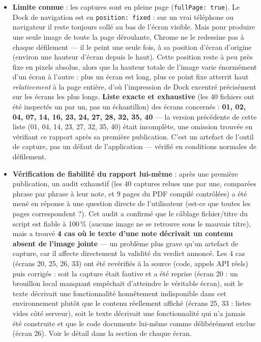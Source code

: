 \documentclass[11pt]{article}
\begin{document}
\begin{itemize}
  \item \textbf{Limite connue} : les captures sont en \og pleine page\fg{} (\texttt{fullPage: true}). Le Dock de navigation est en \texttt{position: fixed} : sur un vrai téléphone ou navigateur il reste toujours collé au bas de l'écran visible. Mais pour produire une seule image de toute la page déroulante, Chrome ne le redessine pas à chaque défilement — il le peint une seule fois, à sa position d'écran d'origine (environ une hauteur d'écran depuis le haut). Cette position reste à peu près fixe en pixels absolus, alors que la hauteur totale de l'image varie énormément d'un écran à l'autre : plus un écran est long, plus ce point fixe atterrit haut \emph{relativement} à la page entière, d'où l'impression de Dock \og excentré\fg{} précisément sur les écrans les plus longs. \textbf{Liste exacte et exhaustive} (les 40 fichiers ont été inspectés un par un, pas un échantillon) des écrans concernés : \textbf{01, 02, 04, 07, 14, 16, 23, 24, 27, 28, 32, 35, 40} — la version précédente de cette liste (01, 04, 14, 23, 27, 32, 35, 40) était incomplète, une omission trouvée en vérifiant ce rapport après sa première publication. C'est un artefact de l'outil de capture, pas un défaut de l'application — vérifié en conditions normales de défilement.
  \item \textbf{Vérification de fiabilité du rapport lui-même} : après une première publication, un audit exhaustif (les 40 captures relues une par une, comparées phrase par phrase à leur note, et 9 pages du PDF compilé contrôlées) a été mené en réponse à une question directe de l'utilisateur (\og est-ce que toutes les pages correspondent ?\fg{}). Cet audit a confirmé que le câblage fichier/titre du script est fiable à 100\,\% (aucune image ne se retrouve sous le mauvais titre), mais a trouvé \textbf{4 cas où le texte d'une note décrivait un contenu absent de l'image jointe} — un problème plus grave qu'un artefact de capture, car il affecte directement la validité du verdict annoncé. Les 4 cas (écrans 20, 25, 26, 33) ont été revérifiés à la source (code, appels API réels) puis corrigés : soit la capture était fautive et a été reprise (écran 20 : un brouillon local manquant empêchait d'atteindre le véritable écran), soit le texte décrivait une fonctionnalité honnêtement indisponible dans cet environnement plutôt que le contenu réellement affiché (écrans 25, 33 : listes vides côté serveur), soit le texte décrivait une fonctionnalité qui n'a jamais été construite et que le code documente lui-même comme délibérément exclue (écran 26). Voir le détail dans la section de chaque écran.

\end{itemize}
\end{document}
